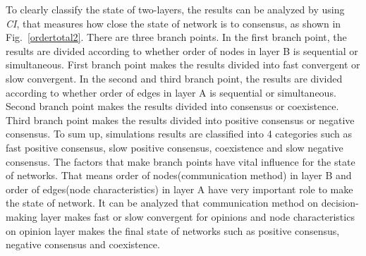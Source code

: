 To clearly classify the state of two-layers, the results can be analyzed by using \textit{CI}, that measures how close the state of network is to consensus, as shown in Fig.~\ref{ordertotal2}. There are three branch points. In the first branch point, the results are divided according to whether order of nodes in layer B is sequential or simultaneous. First branch point makes the results divided into fast convergent or slow convergent. In the second and third branch point, the results are divided according to whether order of edges in layer A is sequential or simultaneous. Second branch point makes the results divided into consensus or coexistence. Third branch point makes the results divided into positive consensus or negative consensus. To sum up, simulations results are classified into 4 categories such as fast positive consensus, slow positive consensus, coexistence and slow negative consensus. The factors that make branch points have vital influence for the state of networks. That means order of nodes(communication method) in layer B and order of edges(node characteristics) in layer A have very important role to make the state of network. It can be analyzed that communication method on decision-making layer makes fast or slow convergent for opinions and node characteristics on opinion layer makes the final state of networks such as positive consensus, negative consensus and coexistence. 

